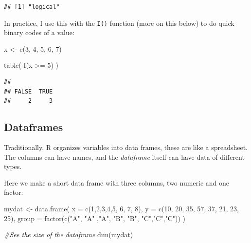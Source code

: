 \documentclass[
]{article}
\newenvironment{Shaded}{\begin{snugshade}}{\end{snugshade}}
\newcommand{\AttributeTok}[1]{\textcolor[rgb]{0.77,0.63,0.00}{#1}}
\newcommand{\CommentTok}[1]{\textcolor[rgb]{0.56,0.35,0.01}{\textit{#1}}}
\newcommand{\DecValTok}[1]{\textcolor[rgb]{0.00,0.00,0.81}{#1}}
\newcommand{\FunctionTok}[1]{\textcolor[rgb]{0.00,0.00,0.00}{#1}}
\newcommand{\NormalTok}[1]{#1}
\newcommand{\OtherTok}[1]{\textcolor[rgb]{0.56,0.35,0.01}{#1}}
\newcommand{\SpecialCharTok}[1]{\textcolor[rgb]{0.00,0.00,0.00}{#1}}
\newcommand{\StringTok}[1]{\textcolor[rgb]{0.31,0.60,0.02}{#1}}
\begin{document}
\begin{verbatim}
## [1] "logical"
\end{verbatim}

In practice, I use this with the \texttt{I()} function (more on this below) to
do quick binary codes of a value:

\begin{Shaded}
\begin{Highlighting}[]
\NormalTok{x }\OtherTok{\textless{}{-}} \FunctionTok{c}\NormalTok{(}\DecValTok{3}\NormalTok{, }\DecValTok{4}\NormalTok{, }\DecValTok{5}\NormalTok{, }\DecValTok{6}\NormalTok{, }\DecValTok{7}\NormalTok{)}

\FunctionTok{table}\NormalTok{( }\FunctionTok{I}\NormalTok{(x }\SpecialCharTok{\textgreater{}=} \DecValTok{5}\NormalTok{) )}
\end{Highlighting}
\end{Shaded}

\begin{verbatim}
## 
## FALSE  TRUE 
##     2     3
\end{verbatim}

\hypertarget{dataframes}{%
\subsection{Dataframes}\label{dataframes}}

Traditionally, R organizes variables into data frames, these are like a
spreadsheet. The columns can have names, and the \emph{dataframe} itself can
have data of different types.

Here we make a short data frame with three columns, two numeric and one
factor:

\begin{Shaded}
\begin{Highlighting}[]
\NormalTok{mydat }\OtherTok{\textless{}{-}} \FunctionTok{data.frame}\NormalTok{(}
  \AttributeTok{x =} \FunctionTok{c}\NormalTok{(}\DecValTok{1}\NormalTok{,}\DecValTok{2}\NormalTok{,}\DecValTok{3}\NormalTok{,}\DecValTok{4}\NormalTok{,}\DecValTok{5}\NormalTok{, }\DecValTok{6}\NormalTok{, }\DecValTok{7}\NormalTok{, }\DecValTok{8}\NormalTok{),}
  \AttributeTok{y =} \FunctionTok{c}\NormalTok{(}\DecValTok{10}\NormalTok{, }\DecValTok{20}\NormalTok{, }\DecValTok{35}\NormalTok{, }\DecValTok{57}\NormalTok{, }\DecValTok{37}\NormalTok{, }\DecValTok{21}\NormalTok{, }\DecValTok{23}\NormalTok{, }\DecValTok{25}\NormalTok{),}
  \AttributeTok{group =} \FunctionTok{factor}\NormalTok{(}\FunctionTok{c}\NormalTok{(}\StringTok{"A"}\NormalTok{, }\StringTok{"A"}\NormalTok{ ,}\StringTok{"A"}\NormalTok{, }\StringTok{"B"}\NormalTok{, }\StringTok{"B"}\NormalTok{, }\StringTok{"C"}\NormalTok{,}\StringTok{"C"}\NormalTok{,}\StringTok{"C"}\NormalTok{))}
\NormalTok{)}

\CommentTok{\#See the size of the dataframe}
\FunctionTok{dim}\NormalTok{(mydat)}
\end{Highlighting}
\end{Shaded}
\end{document}
